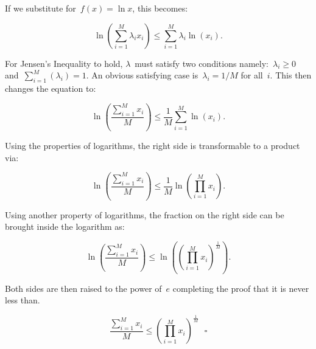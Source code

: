 \documentclass{report}
\begin{document}
  If we substitute for~$f(x)=\ln x$, this becomes:

  \[ \ln \left( \sum_{i=1}^M{\lambda_{i} x_i} \right) \leq \sum_{i=1}^M{\lambda_{i} \ln(x_i)}\textrm{.} \]
  
  For Jensen's Inequality to hold, $\lambda$~must satisfy two conditions namely:~$\lambda_i \geq 0$ and~$\sum_{i=1}^{M}\left( \lambda_i \right) = 1$.  An obvious satisfying case is~$\lambda_i=1/M$ for all~$i$.  This then changes the equation to:
  
  \[ \ln \left( \frac{\sum_{i=1}^{M}{x_i}}{M} \right) \leq \frac{1}{M}\sum_{i=1}^M{\ln(x_i)}\textrm{.} \]
  
  Using the properties of logarithms, the right side is transformable to a product via:
  
  \[ \ln \left( \frac{\sum_{i=1}^{M}{x_i}}{M} \right) \leq \frac{1}{M}{\ln \left( \prod_{i=1}^M{x_i} \right)}\textrm{.} \]
  
  Using another property of logarithms, the fraction on the right side can be brought inside the logarithm as:
  
  \[ \ln \left( \frac{\sum_{i=1}^{M}{x_i}}{M} \right) \leq \ln \left( \left( \prod_{i=1}^M{x_i}\right)^\frac{1}{M} \right) \textrm{.} \]
  
  Both sides are then raised to the power of~$e$ completing the proof that it is never less than.
  
    \[ \frac{\sum_{i=1}^{M}{x_i}}{M} \leq \left( \prod_{i=1}^M{x_i}\right)^\frac{1}{M}  ~~~\square \]
\end{document}
